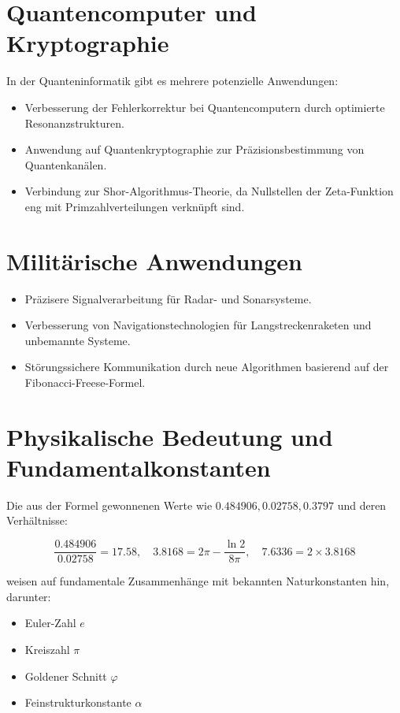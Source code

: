 \documentclass[a4paper,12pt]{article}
\begin{document}
\section{Quantencomputer und Kryptographie}

In der Quanteninformatik gibt es mehrere potenzielle Anwendungen:

\begin{itemize}
    \item Verbesserung der Fehlerkorrektur bei Quantencomputern durch optimierte Resonanzstrukturen.
    \item Anwendung auf Quantenkryptographie zur Präzisionsbestimmung von Quantenkanälen.
    \item Verbindung zur Shor-Algorithmus-Theorie, da Nullstellen der Zeta-Funktion eng mit Primzahlverteilungen verknüpft sind.
\end{itemize}

\section{Militärische Anwendungen}

\begin{itemize}
    \item Präzisere Signalverarbeitung für Radar- und Sonarsysteme.
    \item Verbesserung von Navigationstechnologien für Langstreckenraketen und unbemannte Systeme.
    \item Störungssichere Kommunikation durch neue Algorithmen basierend auf der Fibonacci-Freese-Formel.
\end{itemize}

\section{Physikalische Bedeutung und Fundamentalkonstanten}

Die aus der Formel gewonnenen Werte wie $0.484906, 0.02758, 0.3797$ und deren Verhältnisse:

\begin{equation}
    \frac{0.484906}{0.02758} = 17.58, \quad 3.8168 = 2\pi - \frac{\ln 2}{8\pi}, \quad 7.6336 = 2 \times 3.8168
\end{equation}

weisen auf fundamentale Zusammenhänge mit bekannten Naturkonstanten hin, darunter:

\begin{itemize}
    \item Euler-Zahl $e$
    \item Kreiszahl $\pi$
    \item Goldener Schnitt $\varphi$
    \item Feinstrukturkonstante $\alpha$
\end{itemize}
\end{document}
